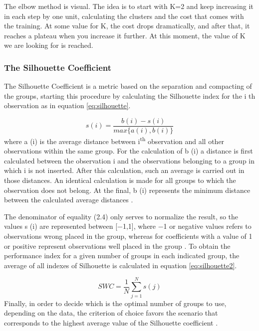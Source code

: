 The elbow method is visual. The idea is to start with K=2 and keep increasing it in each step by one unit, calculating the clusters and the cost that comes with the training. At some value for K, the cost drops dramatically, and after that, it reaches a plateau when you increase it further. At this moment, the value of K we are looking for is reached.

\subsubsection{The Silhouette Coefficient}
\label{subsub:silhouette}
The Silhouette Coefficient is a metric based on the separation and compacting of the groups, starting this procedure by calculating the Silhouette index for the i th observation as in equation \ref{eq:silhouette}.

\begin{equation}
s(i) = \frac{b(i)-s(i)}{max\{a(i),b(i)\}}
\label{eq:silhouette}
\end{equation}
where a (i) is the average distance between i\textsuperscript{th} observation and all other observations within the same group. 
For the calculation of b (i) a distance is first calculated between the observation i and the observations belonging to a group in which i is not inserted. After this calculation, such an average is carried out in those distances. An identical calculation is made for all groups to which the observation does not belong. At the final, b (i) represents the minimum distance between the calculated average distances \cite{Roelofsen2018BusinessAT}.

The denominator of equality (2.4) only serves to normalize the result, so the values s (i) are represented between [−1,1], where −1 or negative values refers to observations wrong placed in the group, whereas for coefficients with a value of 1 or positive represent observations well placed in the group \cite{Roelofsen2018BusinessAT}. 
To obtain the performance index for a given number of groups in each indicated group, the average of all indexes of Silhouette is calculated in equation \ref{eq:silhouette2}.

\begin{equation}
SWC = \frac{1}{N}\sum_{j=1}^{N}s(j)
\label{eq:silhouette2}
\end{equation}
Finally, in order to decide which is the optimal number of groups to use, depending on the data, the criterion of choice favors the scenario that corresponds to the highest average value of the Silhouette coefficient \cite{Roelofsen2018BusinessAT}.


